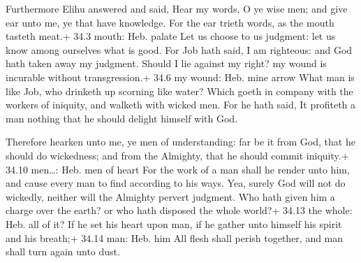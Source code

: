  Furthermore Elihu answered and said,  Hear my
words, O ye wise men; and give ear unto me, ye that have knowledge.
 For the ear trieth words, as the mouth tasteth meat.+ 34.3
mouth: Heb. palate  Let us choose to us judgment: let us
know among ourselves what is good.  For Job hath said, I am
righteous: and God hath taken away my judgment.  Should I
lie against my right? my wound is incurable without transgression.+ 34.6
my wound: Heb. mine arrow  What man is like Job, who
drinketh up scorning like water?  Which goeth in company
with the workers of iniquity, and walketh with wicked men. 
For he hath said, It profiteth a man nothing that he should delight
himself with God.

 Therefore hearken unto me, ye men of understanding: far be
it from God, that he should do wickedness; and from the Almighty, that
he should commit iniquity.+ 34.10 men\ldots: Heb. men of heart
 For the work of a man shall he render unto him, and cause
every man to find according to his ways.  Yea, surely God
will not do wickedly, neither will the Almighty pervert judgment.
 Who hath given him a charge over the earth? or who hath
disposed the whole world?+ 34.13 the whole: Heb. all of it?
 If he set his heart upon man, if he gather unto himself
his spirit and his breath;+ 34.14 man: Heb. him  All flesh
shall perish together, and man shall turn again unto dust.

